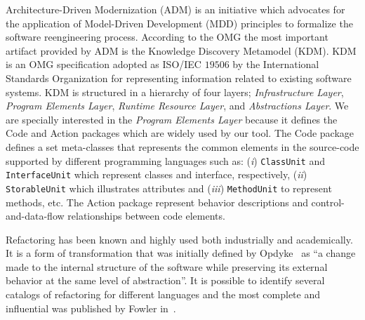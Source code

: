 Architecture-Driven Modernization (ADM) is an initiative which advocates for the application of Model-Driven Development (MDD) principles to formalize the software reengineering process. 
%
%
According to the OMG the most important artifact provided by ADM is the Knowledge Discovery Metamodel (KDM). KDM is an OMG specification adopted as ISO/IEC $19506$ by the International Standards Organization for representing information related to existing software systems.  KDM is structured in a hierarchy of four layers; \textit{Infrastructure Layer}, \textit{Program Elements Layer}, \textit{ Runtime Resource Layer}, and \textit{Abstractions Layer}. We are specially interested in the \textit{Program Elements Layer} because it defines the Code and Action packages which are widely used by our tool. The Code package defines a set meta-classes that represents the common elements in the source-code supported by different programming languages such as: (\textit{i}) \texttt{ClassUnit} and \texttt{InterfaceUnit} which represent classes and interface, respectively, (\textit{ii}) \texttt{StorableUnit} which illustrates attributes and (\textit{iii}) \texttt{MethodUnit} to represent methods, etc. The Action package represent behavior descriptions and control-and-data-flow relationships between code elements.

Refactoring has been known and highly used both industrially and academically. It is a form of transformation that was initially defined by Opdyke~\cite{Opdy92b} as ``a change made to the internal structure of the software while preserving its external behavior at the same level of abstraction''. It is possible to identify several catalogs of refactoring for different languages and the most complete and influential was published by Fowler in~\cite{refactImpro}. 

